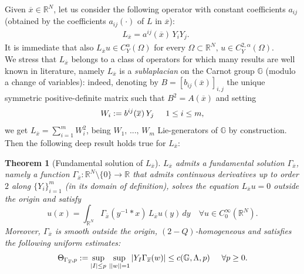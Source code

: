 \documentclass{article}
\newtheorem{theorem}{Theorem}[section]
\numberwithin{equation}{section}
\begin{document}
Given $\overline{x} \in \mathbb{R}^N$, let us consider the following operator with constant coefficients $a_{ij}$ (obtained by  the coefficients $a_{ij}(\cdot)$ of $L$ in $\overline{x}$):
\begin{align}
\label{our freezed operator Carnot}
    & L_{\overline{x}} = a^{ij}(\overline{x}) \, Y_i Y_j.
\end{align}
It is immediate that also $L_{\overline{x}}u \in C^{\alpha}_Y(\Omega)$ for every $\Omega \subset \mathbb{R}^N, \, u \in C^{2,\alpha}_Y(\Omega)$.
\\
We stress that $L_{\overline{x}}$ belongs to a class of operators for which many results are well known in literature, namely $L_{\overline{x}}$ is a \emph{sublaplacian} on the Carnot group $\mathbb{G}$ (modulo a change of variables): indeed, denoting by $B=[b_{ij}(\overline{x})]_{i,j}$ the unique symmetric positive-definite matrix such that $B^2=A(\overline{x})$ and setting
    \begin{equation*}
        W_i :=  b^{ij}(\overline{x}) \, Y_j \hspace{5mm} 1 \leq i \leq m,
    \end{equation*}
     we get $L_{\overline{x}} = \sum_{i=1}^m W_i^2$, being $W_1, \, ..., \, W_m$ Lie-generators of $\mathbb{G}$ by construction. Then the following deep result holds true for $L_{\overline{x}}$:

\vspace{2mm}

\begin{theorem}[Fundamental solution of $L_{\overline{x}}$]
    \label{freezed fund sol}
    $L_{\overline{x}}$ admits a \emph{fundamental solution} $\Gamma_{\overline{x}}$, namely a function $\Gamma_{\overline{x}}:\mathbb{R}^{N} \setminus \{0\} \to \mathbb{R}$ that admits continuous derivatives up to order $2$ along $\{Y_i\}_{i=1}^m$ (in its domain of definition), solves the equation $L_{\overline{x}}u=0$ outside the origin and satisfy
    \begin{equation}
    \label{rep formula u: L Gamma = delta}
        u(x) = \int_{\mathbb{R}^N} \Gamma_{\overline{x}}(y^{-1} * x) \, L_{\overline{x}}u(y) \, dy \quad \forall u \in C^{\infty}_0(\mathbb{R}^N).
    \end{equation}
 Moreover, $\Gamma_{\overline{x}}$ is smooth outside the origin, $(2-Q)$-homogeneous and satisfies the following uniform estimates:
 \begin{equation*}
     \Theta_{\Gamma_{\overline{x}},p} := \sup_{|I| \leq p} \, \sup_{||w||=1} |Y_I \Gamma_{\overline{x}}(w)| \leq c(\mathbb{G}, \Lambda, p) \hspace{5mm} \forall p \geq 0.
 \end{equation*}
\end{theorem}
\end{document}
